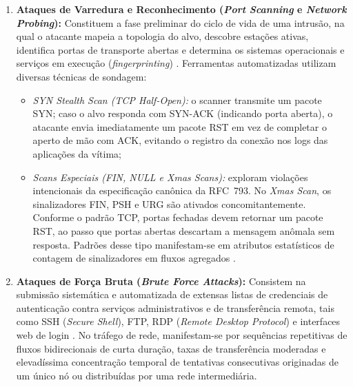 \begin{enumerate}
    \item \textbf{Ataques de Varredura e Reconhecimento (\emph{Port Scanning} e \emph{Network Probing}):}
    Constituem a fase preliminar do ciclo de vida de uma intrusão, na qual o atacante mapeia a topologia do alvo, descobre estações ativas, identifica portas de transporte abertas e determina os sistemas operacionais e serviços em execução (\emph{fingerprinting}) \cite{netflow2020}. Ferramentas automatizadas utilizam diversas técnicas de sondagem:
    \begin{itemize}
        \item \emph{SYN Stealth Scan (TCP Half-Open):} o scanner transmite um pacote SYN; caso o alvo responda com SYN-ACK (indicando porta aberta), o atacante envia imediatamente um pacote RST em vez de completar o aperto de mão com ACK, evitando o registro da conexão nos logs das aplicações da vítima;
        \item \emph{Scans Especiais (FIN, NULL e Xmas Scans):} exploram violações intencionais da especificação canônica da RFC~793. No \emph{Xmas Scan}, os sinalizadores FIN, PSH e URG são ativados concomitantemente. Conforme o padrão TCP, portas fechadas devem retornar um pacote RST, ao passo que portas abertas descartam a mensagem anômala sem resposta. Padrões desse tipo manifestam-se em atributos estatísticos de contagem de sinalizadores em fluxos agregados \cite{standard2021}.
    \end{itemize}

    \item \textbf{Ataques de Força Bruta (\emph{Brute Force Attacks}):}
    Consistem na submissão sistemática e automatizada de extensas listas de credenciais de autenticação contra serviços administrativos e de transferência remota, tais como SSH (\emph{Secure Shell}), FTP, RDP (\emph{Remote Desktop Protocol}) e interfaces web de login \cite{Sharafaldin2018TowardGA}. No tráfego de rede, manifestam-se por sequências repetitivas de fluxos bidirecionais de curta duração, taxas de transferência moderadas e elevadíssima concentração temporal de tentativas consecutivas originadas de um único nó ou distribuídas por uma rede intermediária.


\end{enumerate}
